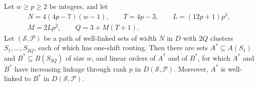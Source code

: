 \documentclass[fontsize=12pt,leading=14pt]{fullpaper}
\newcommand{\Pcal}{\mathcal{P}}
\newcommand{\Scal}{\mathcal{S}}
\begin{document}
\begin{theorem}\label{thm:s3-extraction}
  Let $w\ge p\ge2$ be integers, and let
  \begin{gather*}
    N=4(4p-7)(w-1),\qquad T=4p-3,\qquad L=(12p+1)p^3,\\
    M=2Lp^2,\qquad Q=3+M(T+1).
  \end{gather*}
  Let $(\Scal,\Pcal)$ be a path of well-linked sets of width $N$ in $D$ with $2Q$ clusters $S_1,\dots,S_{2Q}$, each of which has one-shift routing.
  Then there are sets $A^*\subseteq A(S_1)$ and $B^*\subseteq B(S_{2Q})$ of size $w$, and linear orders of $A^*$ and of $B^*$, for which $A^*$ and $B^*$ have increasing linkage through rank $p$ in $D(\Scal,\Pcal)$.
  Moreover, $A^*$ is well-linked to $B^*$ in $D(\Scal,\Pcal)$.
\end{theorem}
\end{document}
